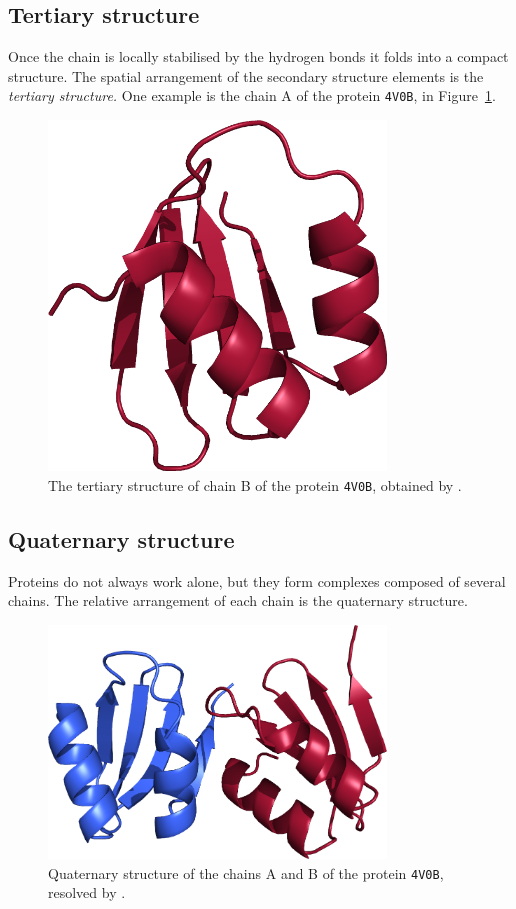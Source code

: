 \subsection{Tertiary structure}
Once the chain is locally stabilised by the hydrogen bonds it folds into a compact structure.
The spatial arrangement of the secondary structure elements is the \emph{tertiary structure.}
One example is the chain A of the protein \texttt{4V0B}, in Figure~\ref{fig:tertiary}.

\begin{figure}[htb]
\centering
\includegraphics[width=0.8\textwidth]{bioinfo/figures/tertiary}
\caption{The tertiary structure of chain B of the protein \texttt{4V0B}, obtained by \citet{4v0b}.}\label{fig:tertiary}
\end{figure}

\subsection{Quaternary structure}
Proteins do not always work alone, but they form complexes composed of several chains.
The relative arrangement of each chain is the quaternary structure.

\begin{figure}[htb]
\centering
\includegraphics[width=0.8\textwidth]{bioinfo/figures/quaternary}
\caption{Quaternary structure of the chains A and B of the protein \texttt{4V0B}, resolved by \citet{4v0b}.}\label{fig:quaternary}
\end{figure}

